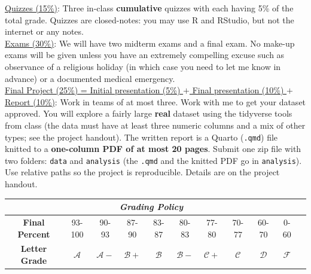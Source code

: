 \documentclass[11pt, a4paper]{article}
\begin{document}
\noindent \underline{Quizzes (15\%)}: Three in-class {\bf cumulative} quizzes with each having 5\% of the total grade. Quizzes are closed-notes: you may use R and RStudio, but not the internet or any notes. 
\vspace{1mm} \\
\noindent \underline{Exams (30\%)}: We will have two midterm exams and a final exam. No make-up exams will be given unless you have an extremely compelling excuse such as observance of a religious holiday (in which case you need to let me know in advance) or a documented medical emergency.
\vspace{1mm} \\
\noindent \underline{Final Project (25\%) = Initial presentation (5\%) $+$ Final presentation (10\%) $+$ Report (10\%)}: Work in teams of at most three. Work with me to get your dataset approved. You will explore a fairly large \textbf{real} dataset using the tidyverse tools from class (the data must have at least three numeric columns and a mix of other types; see the project handout). The written report is a Quarto (\texttt{.qmd}) file knitted to a \textbf{one-column PDF of at most 20 pages}. Submit one zip file with two folders: \texttt{data} and \texttt{analysis} (the \texttt{.qmd} and the knitted PDF go in \texttt{analysis}). Use relative paths so the project is reproducible. Details are on the project handout.



\begin{table}[ht]
\centering
\begin{tabular}{|c|c|c|c|c|c|c|c|c|c|c|}
\hline
\multicolumn{10}{|c|}{\large{\textbf{\textit{Grading Policy}}}} \\
\hline
\bf{Final Percent} &  93-100 & 90-93 & 87-90 & 83-87 & 80-83 & 77-80 & 70-77 
& 60-70&  0-60\\
\hline
\bf{Letter Grade}&   $\mathcal{A}$ & $\mathcal{A-}$ & $\mathcal{B+}$ & $\mathcal{B}$ & $\mathcal{B-}$ & $\mathcal{C+}$ & $\mathcal{C}$
& $\mathcal{D}$&$\mathcal{F}$\\
\hline
\end{tabular}
\end{table}

\end{document}
